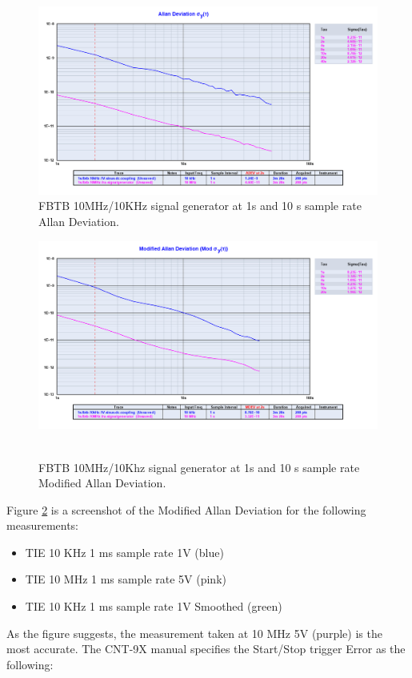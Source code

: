 \documentclass[11pt,english,a4paper]{article}
\begin{document}
\begin{figure}[!htb]
  \centering
    \includegraphics[width=1\textwidth]{fbtb_10mhzkhz_generator_allan.png}
    \caption{FBTB 10MHz/10KHz signal generator at 1s and 10 s sample rate Allan Deviation.}
        \label{fig:sg_10x_allan_dev}
\end{figure}

\begin{figure}[!htb]
  \centering
    \includegraphics[width=1\textwidth]{fbtb_10mhzkhz_generator_mod_allan.png}\
  \caption{FBTB 10MHz/10Khz signal generator at 1s and 10 s sample rate Modified Allan Deviation.}
      \label{fig:sg_10x_mod_allan_dev}
\end{figure}

Figure \ref{fig:sg_10x_mod_allan_dev} is a screenshot of the Modified Allan Deviation for the following measurements:
\begin{itemize}
  \item TIE 10 KHz 1 ms sample rate 1V (blue)
  \item TIE 10 MHz 1 ms sample rate 5V (pink)
  \item TIE 10 KHz 1 ms sample rate 1V Smoothed (green)
\end{itemize}
As the figure suggests, the measurement taken at 10 MHz 5V (purple) is the most accurate. The CNT-9X manual specifies the Start/Stop trigger Error as the following:
\end{document}
